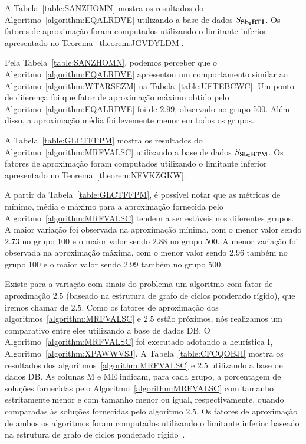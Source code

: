 A Tabela~\ref{table:SANZHOMN} mostra os resultados do Algoritmo~\ref{algorithm:EQALRDVE} utilizando a base de dados $S_{\textbf{Sb\textsubscript{I}RTI}}{}$. Os fatores de aproximação foram computados utilizando o limitante inferior apresentado no Teorema~\ref{theorem:JGVDYLDM}.



Pela Tabela~\ref{table:SANZHOMN}, podemos perceber que o Algoritmo~\ref{algorithm:EQALRDVE} apresentou um comportamento similar ao Algoritmo~\ref{algorithm:WTARSEZM} na Tabela~\ref{table:UFTEBCWC}. Um ponto de diferença foi que fator de aproximação máximo obtido pelo Algoritmo~\ref{algorithm:EQALRDVE} foi de $2.99$, observado no grupo 500. Além disso, a aproximação média foi levemente menor em todos os grupos. 

A Tabela~\ref{table:GLCTFFPM} mostra os resultados do Algoritmo~\ref{algorithm:MRFVALSC} utilizando a base de dados $S_{\textbf{Sb\textsubscript{I}RTM}}{}$. Os fatores de aproximação foram computados utilizando o limitante inferior apresentado no Teorema~\ref{theorem:NFVKZGKW}.



A partir da Tabela~\ref{table:GLCTFFPM}, é possível notar que as métricas de mínimo, média e máximo para a aproximação fornecida pelo Algoritmo~\ref{algorithm:MRFVALSC} tendem a ser estáveis nos diferentes grupos. A maior variação foi observada na aproximação mínima, com o menor valor sendo $2.73$ no grupo 100 e o maior valor sendo $2.88$ no grupo 500. A menor variação foi observada na aproximação máxima, com o menor valor sendo $2.96$ também no grupo 100 e o maior valor sendo $2.99$ também no grupo 500. 

Existe para a variação com sinais do problema \SbIRTM{} um algoritmo com fator de aproximação $2.5$ (baseado na estrutura de grafo de ciclos ponderado rígido), que iremos chamar de $2.5$\SbIRTM{}. Como os fatores de aproximação dos algoritmos~\ref{algorithm:MRFVALSC} e $2.5$\SbIRTM{} estão próximos, nós realizamos um comparativo entre eles utilizando a base de dados DB\textsubscript{\SbIRTM}. O Algoritmo~\ref{algorithm:MRFVALSC} foi executado adotando a heurística I, Algoritmo~\ref{algorithm:XPAWWVSJ}. A Tabela~\ref{table:CFCQOBJI} mostra os resultados dos algoritmos~\ref{algorithm:MRFVALSC} e $2.5$\SbIRTM{} utilizando a base de dados DB\textsubscript{\SbIRTM}. As colunas M e ME indicam, para cada grupo, a porcentagem de soluções fornecidas pelo Algoritmo~\ref{algorithm:MRFVALSC} com tamanho estritamente menor e com tamanho menor ou igual, respectivamente, quando comparadas às soluções fornecidas pelo algoritmo $2.5$\SbIRTM{}. Os fatores de aproximação de ambos os algoritmos foram computados utilizando o limitante inferior baseado na estrutura de grafo de ciclos ponderado rígido~\cite[Teorema 7.6]{2021a-oliveira-etal}.

